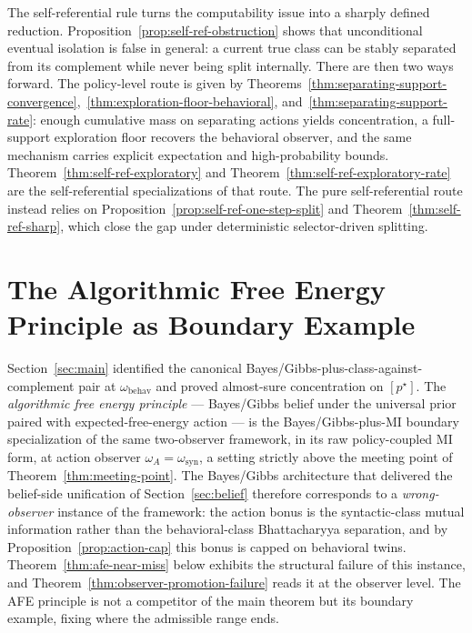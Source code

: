 \documentclass[11pt]{article}
\theoremstyle{definition}
\theoremstyle{remark}
\begin{document}
The self-referential rule turns the computability issue into a sharply defined reduction. Proposition~\ref{prop:self-ref-obstruction} shows that unconditional eventual isolation is false in general: a current true class can be stably separated from its complement while never being split internally. There are then two ways forward. The policy-level route is given by Theorems~\ref{thm:separating-support-convergence},~\ref{thm:exploration-floor-behavioral}, and~\ref{thm:separating-support-rate}: enough cumulative mass on separating actions yields concentration, a full-support exploration floor recovers the behavioral observer, and the same mechanism carries explicit expectation and high-probability bounds. Theorem~\ref{thm:self-ref-exploratory} and Theorem~\ref{thm:self-ref-exploratory-rate} are the self-referential specializations of that route. The pure self-referential route instead relies on Proposition~\ref{prop:self-ref-one-step-split} and Theorem~\ref{thm:self-ref-sharp}, which close the gap under deterministic selector-driven splitting.

\section{The Algorithmic Free Energy Principle as Boundary Example}
\label{sec:boundary-example}
\label{sec:near-miss}

Section~\ref{sec:main} identified the canonical Bayes/Gibbs-plus-class-against-complement pair at $\omega_{\mathrm{behav}}$ and proved almost-sure concentration on $[p^\star]$. The \emph{algorithmic free energy principle} --- Bayes/Gibbs belief under the universal prior paired with expected-free-energy action --- is the Bayes/Gibbs-plus-MI boundary specialization of the same two-observer framework, in its raw policy-coupled MI form, at action observer $\omega_A=\omega_{\mathrm{syn}}$, a setting strictly above the meeting point of Theorem~\ref{thm:meeting-point}. The Bayes/Gibbs architecture that delivered the belief-side unification of Section~\ref{sec:belief} therefore corresponds to a \emph{wrong-observer} instance of the framework: the action bonus is the syntactic-class mutual information rather than the behavioral-class Bhattacharyya separation, and by Proposition~\ref{prop:action-cap} this bonus is capped on behavioral twins. Theorem~\ref{thm:afe-near-miss} below exhibits the structural failure of this instance, and Theorem~\ref{thm:observer-promotion-failure} reads it at the observer level. The AFE principle is not a competitor of the main theorem but its boundary example, fixing where the admissible range ends.
\end{document}
